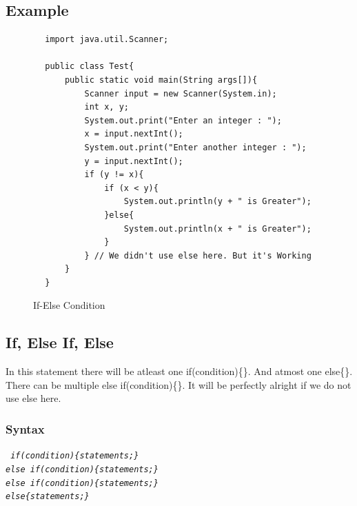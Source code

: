 \documentclass[openany]{book}  %
\begin{document}
\subsection{Example}
\begin{center}
    \begin{verbatim}
        import java.util.Scanner;

        public class Test{
            public static void main(String args[]){
                Scanner input = new Scanner(System.in);
                int x, y;
                System.out.print("Enter an integer : ");
                x = input.nextInt();
                System.out.print("Enter another integer : ");
                y = input.nextInt();
                if (y != x){
                    if (x < y){
                        System.out.println(y + " is Greater");
                    }else{
                        System.out.println(x + " is Greater");
                    }
                } // We didn't use else here. But it's Working
            }
        }
    \end{verbatim}
\end{center}
% 
% 
\begin{figure}[htbp]
    \begin{center}
        \caption{If-Else Condition}
    \end{center}
\end{figure}
% 
% 
\subsection{If, Else If, Else}
In this statement there will be atleast one if(condition)\{\}. And atmost one else\{\}. There can be multiple else if(condition)\{\}.
It will be perfectly alright if we do not use else here.
% 
% 
\subsubsection{Syntax}
\begin{center}
    \tt{
        \textit{if(condition)\{statements;\}\\else if(condition)\{statements;\}\\else if(condition)\{statements;\}\\else\{statements;\}}
    }
\end{center}
% 
% 
\end{document}
